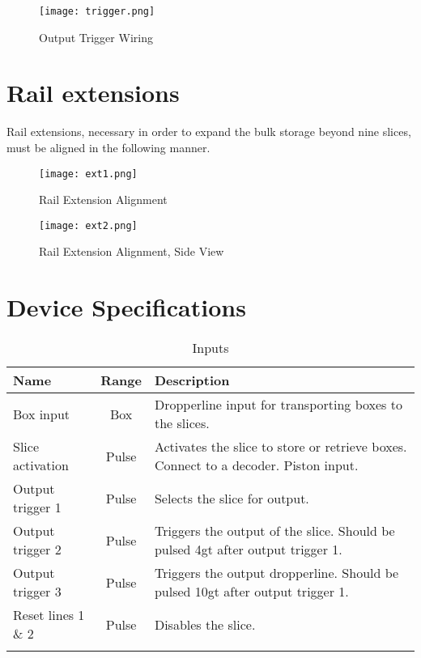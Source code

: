 \documentclass[10pt]{datasheet}
\begin{document}
\begin{figure}[H]
    \centering
    \texttt{[image: trigger.png]}
    \caption{\centering Output Trigger Wiring}
\end{figure}

\section{Rail extensions}
Rail extensions, necessary in order to expand the bulk storage beyond nine slices, must be aligned in the following manner.

\begin{figure}[H]
    \centering
    \texttt{[image: ext1.png]}
    \caption{\centering Rail Extension Alignment}
\end{figure}

\begin{figure}[H]
    \centering
    \texttt{[image: ext2.png]}
    \caption{\centering Rail Extension Alignment, Side View}
\end{figure}

\newpage
\section{Device Specifications}

\begin{table}[H]
    \caption{Inputs}
    \begin{tabularx}{\textwidth}{l | c | X}
        \thickhline
        \textbf{Name} & \textbf{Range} & \textbf{Description} \\
        \hline
        Box input & Box & Dropperline input for transporting boxes to the slices. \\
        \hline
        Slice activation & Pulse & Activates the slice to store or retrieve boxes. Connect to a decoder. Piston input. \\
        \hline
        Output trigger 1 & Pulse & Selects the slice for output. \\
        \hline
        Output trigger 2 & Pulse & Triggers the output of the slice. Should be pulsed 4gt after output trigger 1. \\
        \hline
        Output trigger 3 & Pulse & Triggers the output dropperline. Should be pulsed 10gt after output trigger 1. \\
        \hline
        Reset lines 1 \& 2 & Pulse & Disables the slice. \\
        \thickhline
\end{tabularx}
\end{table}
\end{document}
